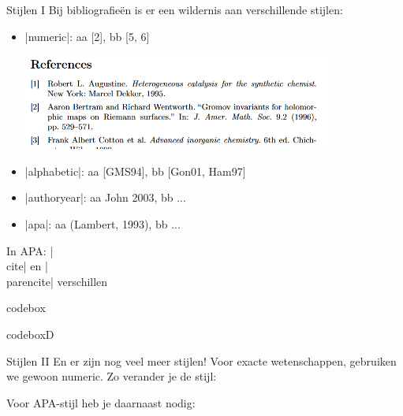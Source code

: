 
\begin{frame}{Stijlen I}
	Bij bibliografie\"en is er een wildernis aan verschillende stijlen:
	
	\begin{itemize}
		\item \hll|numeric|: aa [2], bb [5, 6]\par
		\includegraphics[width=0.8\textwidth]{assets/biblatexStyles/numericReferences.png}
		
		\item\hll|alphabetic|: aa [GMS94], bb [Gon01, Ham97]
		\item\hll|authoryear|: aa John 2003, bb ...
		\item\hll|apa|: aa (Lambert, 1993), bb ...
	\end{itemize}
	In APA: \hll|\\cite| en \hll|\\parencite| verschillen
\end{frame}


\begin{saveblock}{codebox}
	\begin{highlightblock}
		\usepackage[style=numeric]{biblatex}
	\end{highlightblock}
\end{saveblock}


\begin{saveblock}{codeboxD}%
	\begin{highlightblock}
	\end{highlightblock}
\end{saveblock}

\begin{frame}{Stijlen II}
	En er zijn nog veel meer stijlen! Voor exacte wetenschappen, gebruiken we gewoon numeric. Zo
	verander je de stijl:
	
	\medskip
	Voor APA-stijl heb je daarnaast nodig:
\end{frame}
